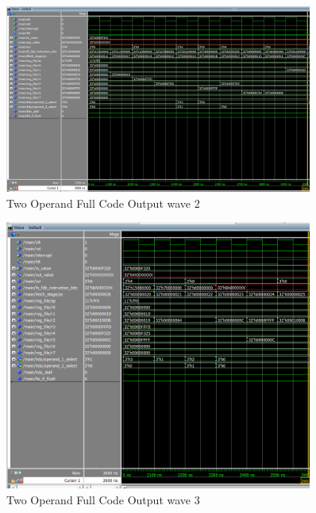 \begin{figure}[H]
    \centering
    \includegraphics[width=0.9\textwidth]{images/test_cases/two_operand/TwoOperand_regular_2.PNG}
    \caption{Two Operand Full Code Output wave 2}
    \label{fig:2op_reg_2}
\end{figure}

\begin{figure}[H]
    \centering
    \includegraphics[width=0.9\textwidth]{images/test_cases/two_operand/TwoOperand_regular_3.PNG}
    \caption{Two Operand Full Code Output wave 3}
    \label{fig:2op_reg_3}
\end{figure}

